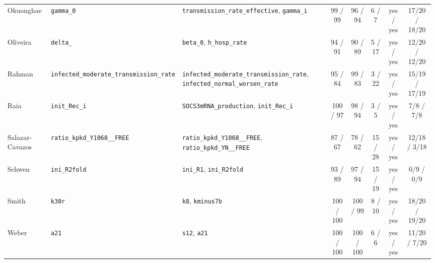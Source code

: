 \begin{longtable}{@{}>{\raggedright\arraybackslash}p{1.7cm}>{\raggedright\arraybackslash}p{2.6cm}>{\raggedright\arraybackslash}p{3.0cm}ccccc@{}}
Okuonghae & \texttt{gamma\_\allowbreak{}0} & \texttt{transmission\_\allowbreak{}rate\_\allowbreak{}effective}, \texttt{gamma\_\allowbreak{}i} & 99 / 99 & 96 / 94 & 6 / 7 & yes / yes & 17/20 / 18/20 \\
Oliveira & \texttt{delta\_\allowbreak{}} & \texttt{beta\_\allowbreak{}0}, \texttt{h\_\allowbreak{}hosp\_\allowbreak{}rate} & 94 / 91 & 90 / 89 & 5 / 17 & yes / yes & 12/20 / 12/20 \\
Rahman & \texttt{infected\_\allowbreak{}moderate\_\allowbreak{}transmission\_\allowbreak{}rate} & \texttt{infected\_\allowbreak{}moderate\_\allowbreak{}transmission\_\allowbreak{}rate}, \texttt{infected\_\allowbreak{}normal\_\allowbreak{}worsen\_\allowbreak{}rate} & 95 / 84 & 99 / 83 & 3 / 22 & yes / yes & 15/19 / 17/19 \\
Raia & \texttt{init\_\allowbreak{}Rec\_\allowbreak{}i} & \texttt{SOCS3mRNA\_\allowbreak{}production}, \texttt{init\_\allowbreak{}Rec\_\allowbreak{}i} & 100 / 97 & 98 / 94 & 3 / 5 & yes / yes & 7/8 / 7/8 \\
Salazar-Cavazos & \texttt{ratio\_\allowbreak{}kpkd\_\allowbreak{}Y1068\_\allowbreak{}\_\allowbreak{}FREE} & \texttt{ratio\_\allowbreak{}kpkd\_\allowbreak{}Y1068\_\allowbreak{}\_\allowbreak{}FREE}, \texttt{ratio\_\allowbreak{}kpkd\_\allowbreak{}YN\_\allowbreak{}\_\allowbreak{}FREE} & 87 / 67 & 78 / 62 & 15 / 28 & yes / yes & 12/18 / 3/18 \\
Schwen & \texttt{ini\_\allowbreak{}R2fold} & \texttt{ini\_\allowbreak{}R1}, \texttt{ini\_\allowbreak{}R2fold} & 93 / 89 & 97 / 94 & 15 / 19 & yes / yes & 0/9 / 0/9 \\
Smith & \texttt{k30r} & \texttt{k8}, \texttt{kminus7b} & 100 / 100 & 100 / 99 & 8 / 10 & yes / yes & 18/20 / 19/20 \\
Weber & \texttt{a21} & \texttt{s12}, \texttt{a21} & 100 / 100 & 100 / 100 & 6 / 6 & yes / yes & 11/20 / 7/20 \\
\bottomrule
\end{longtable}
